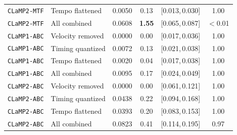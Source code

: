 \documentclass[11pt]{article}
\begin{document}
\begin{table}[t]
\begin{tabular}{@{}llcccc@{}}
\texttt{CLaMP2-MTF} & Tempo flattened & 0.0050 & {0.13} & [0.013,\,0.030] & 1.00 \\
\texttt{CLaMP2-MTF} & All combined & 0.0608 & \textbf{1.55} & [0.065,\,0.087] & $<$0.01 \\
\addlinespace
\texttt{CLaMP1-ABC} & Velocity removed & 0.0000 & {0.00} & [0.017,\,0.036] & 1.00 \\
\texttt{CLaMP1-ABC} & Timing quantized & 0.0072 & {0.13} & [0.021,\,0.038] & 1.00 \\
\texttt{CLaMP1-ABC} & Tempo flattened & 0.0020 & {0.04} & [0.017,\,0.038] & 1.00 \\
\texttt{CLaMP1-ABC} & All combined & 0.0095 & {0.17} & [0.024,\,0.049] & 1.00 \\
\addlinespace
\texttt{CLaMP2-ABC} & Velocity removed & 0.0000 & {0.00} & [0.061,\,0.121] & 1.00 \\
\texttt{CLaMP2-ABC} & Timing quantized & 0.0438 & {0.22} & [0.094,\,0.168] & 1.00 \\
\texttt{CLaMP2-ABC} & Tempo flattened & 0.0393 & {0.20} & [0.083,\,0.153] & 1.00 \\
\texttt{CLaMP2-ABC} & All combined & 0.0823 & {0.41} & [0.114,\,0.195] & 0.97 \\
\bottomrule
\end{tabular}
\end{table}
\end{document}
